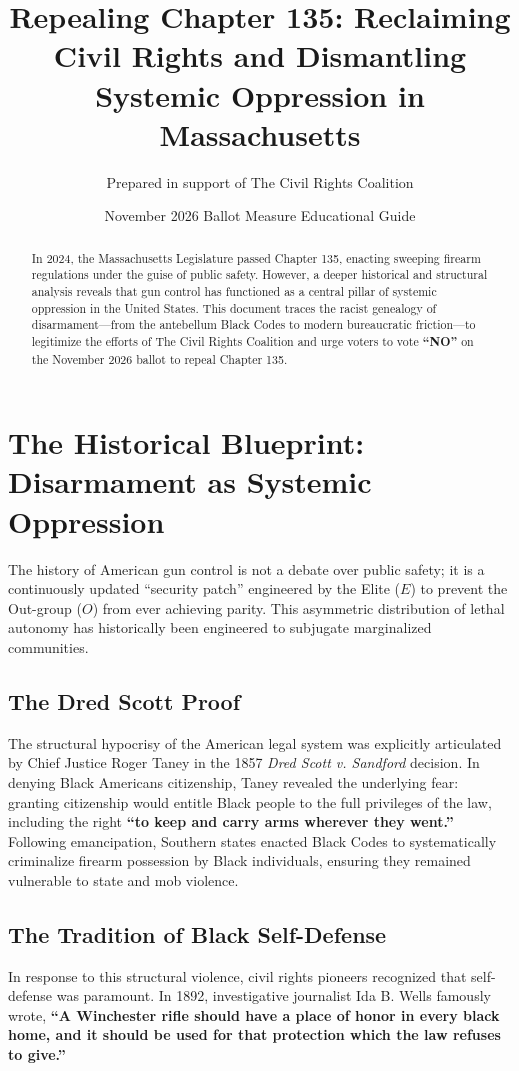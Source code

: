 \documentclass[12pt]{article}
\title{\textbf{Repealing Chapter 135: Reclaiming Civil Rights and Dismantling Systemic Oppression in Massachusetts}}
\author{Prepared in support of The Civil Rights Coalition}
\date{November 2026 Ballot Measure Educational Guide}
\begin{document}
\maketitle

\begin{abstract}
In 2024, the Massachusetts Legislature passed Chapter 135, enacting sweeping firearm regulations under the guise of public safety. However, a deeper historical and structural analysis reveals that gun control has functioned as a central pillar of systemic oppression in the United States. This document traces the racist genealogy of disarmament—from the antebellum Black Codes to modern bureaucratic friction—to legitimize the efforts of The Civil Rights Coalition and urge voters to vote \textbf{``NO''} on the November 2026 ballot to repeal Chapter 135.
\end{abstract}

\section{The Historical Blueprint: Disarmament as Systemic Oppression}
The history of American gun control is not a debate over public safety; it is a continuously updated ``security patch'' engineered by the Elite ($E$) to prevent the Out-group ($O$) from ever achieving parity. This asymmetric distribution of lethal autonomy has historically been engineered to subjugate marginalized communities.

\subsection{The Dred Scott Proof}
The structural hypocrisy of the American legal system was explicitly articulated by Chief Justice Roger Taney in the 1857 \textit{Dred Scott v. Sandford} decision. In denying Black Americans citizenship, Taney revealed the underlying fear: granting citizenship would entitle Black people to the full privileges of the law, including the right \textbf{``to keep and carry arms wherever they went.''} Following emancipation, Southern states enacted Black Codes to systematically criminalize firearm possession by Black individuals, ensuring they remained vulnerable to state and mob violence.

\subsection{The Tradition of Black Self-Defense}
In response to this structural violence, civil rights pioneers recognized that self-defense was paramount. In 1892, investigative journalist Ida B. Wells famously wrote, \textbf{``A Winchester rifle should have a place of honor in every black home, and it should be used for that protection which the law refuses to give.''} 
\end{document}
